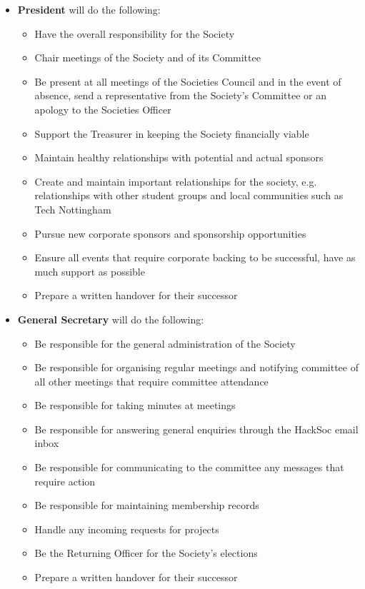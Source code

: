 \documentclass[a4paper,twoside,notitlepage,11pt]{article}
\begin{document}
\begin{itemize}
	\item \textbf{President} will do the following:
	\begin{itemize}
	  \item Have the overall responsibility for the Society
	  \item Chair meetings of the Society and of its Committee
	  \item Be present at all meetings of the Societies Council and in the event of absence, send a representative from the Society's Committee or an apology to the Societies Officer
	  \item Support the Treasurer in keeping the Society financially viable
	  \item Maintain healthy relationships with potential and actual sponsors
	  \item Create and maintain important relationships for the society, e.g. relationships with other student groups and local communities such as Tech Nottingham
	  \item Pursue new corporate sponsors and sponsorship opportunities
	  \item Ensure all events that require corporate backing to be successful, have as much support as possible
	  \item Prepare a written handover for their successor
	\end{itemize}
	\item \textbf{General Secretary} will do the following:
	\begin{itemize}
	  \item Be responsible for the general administration of the Society
	  \item Be responsible for organising regular meetings and notifying committee of all other meetings that require committee attendance
	  \item Be responsible for taking minutes at meetings
	  \item Be responsible for answering general enquiries through the HackSoc email inbox
	  \item Be responsible for communicating to the committee any messages that require action
	  \item Be responsible for maintaining membership records
	  \item Handle any incoming requests for projects
	  \item Be the Returning Officer for the Society's elections
	  \item Prepare a written handover for their successor

\end{itemize}
\end{itemize}
\end{document}
